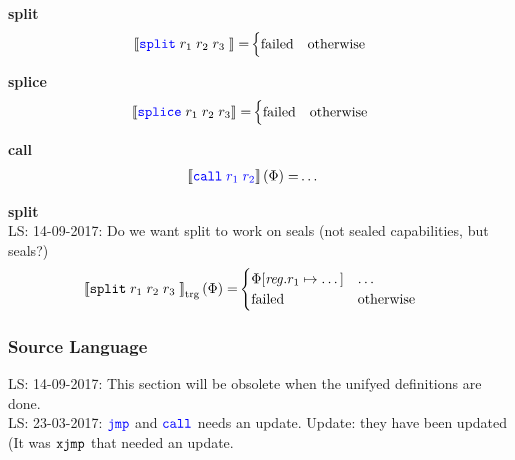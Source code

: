 \documentclass[a4paper]{article}
\newcommand\lau[1]{{\color{purple} \sf \footnotesize {LS: #1}}\\}
\newcommand{\sem}[1]{\left\llbracket #1 \right\rrbracket}
\newcommand{\tsem}[2][\Phi]{\sem{#2}_{\mathrm{trg}}(#1)}
\newcommand{\totherwise}{\text{otherwise }}
\newcommand{\sourcecolor}[1]{\color{blue}}
\newcommand{\src}[1]{{\sourcecolor{} #1}}
\newcommand{\targetcolor}[1]{\color{black}}
\newcommand{\trg}[1]{{\targetcolor{} #1}}
\newcommand{\zinstr}[1]{\texttt{#1}}
\newcommand{\oneinstr}[2]{
  \ifthenelse{\equal{#2}{}}
  {\zinstr{#1}}
  {\zinstr{#1} \; #2}
}
\newcommand{\twoinstr}[3]{
  \ifthenelse{\equal{#2#3}{}}
  {\zinstr{#1}}
  {\zinstr{#1} \; #2 \; #3}
}
\newcommand{\threeinstr}[4]{
  \ifthenelse{\equal{#2#3#4}{}}
  {\zinstr{#1}}
  {\zinstr{#1} \; #2 \; #3 \; #4}
}
\newcommand{\fourinstr}[5]{
  \ifthenelse{\equal{#2#3#4#5}{}}
  {\zinstr{#1}}
  {\zinstr{#1} \; #2 \; #3 \; #4 \; #5}
}
\newcommand{\sjmp}[1]{\oneinstr{\src{jmp}}{#1}}
\newcommand{\scall}[2]{\twoinstr{\src{call}}{#1}{#2}}
\newcommand{\sxjmp}[2]{\twoinstr{\trg{xjmp}}{#1}{#2}}
\newcommand{\ssplice}[3]{\threeinstr{\src{splice}}{#1}{#2}{#3}}
\newcommand{\ssplit}[4]{\fourinstr{\src{split}}{#1}{#2}{#3}{#4}}
\newcommand{\tsplit}[4]{\fourinstr{\trg{split}}{#1}{#2}{#3}{#4}}
\newcommand{\update}[2]{[#1 \mapsto #2]}
\newcommand{\updReg}[2]{\update{\reg.#1}{#2}}
\newcommand{\failed}{\mathrm{failed}}
\newcommand{\var}[1]{\mathit{#1}}
\newcommand{\reg}{\var{reg}}
\begin{document}
\noindent\textbf{split}\\
\begin{align*}
  \sem{\ssplit{r_1}{r_2}{r_3}} = &
                              \begin{cases}
                                \failed & \totherwise
                              \end{cases}
\end{align*}

\noindent\textbf{splice}\\
\begin{align*}
  \sem{\ssplice{r_1}{r_2}{r_3}} = &
                              \begin{cases}
                                \failed & \totherwise
                              \end{cases}
\end{align*}

\noindent\textbf{call}\\
\begin{align*}
  \sem{\scall{\src{r_1}}{\src{r_2}}}(\Phi) = & \dots
\end{align*}


\textbf{split}\\
\lau{14-09-2017: Do we want split to work on seals (not sealed capabilities, but seals?)}
\begin{align*}
  \tsem{\tsplit{r_1}{r_2}{r_3}} = &
                               \begin{cases}
                                 \Phi\updReg{r_1}{\dots} &
                                 \arraycolsep=0pt
                                 \begin{array}[t]{l}
                                   \dots
                                 \end{array}\\
                                 \failed & \totherwise
                               \end{cases}
\end{align*}



\subsubsection{Source Language}
\label{sec:source-language}
\lau{14-09-2017: This section will be obsolete when the unifyed definitions are done.}
\lau{23-03-2017: $\sjmp{}$ and $\scall{}{}$ needs an update. Update: they have been updated (It was $\sxjmp{}{}$ that needed an update.}
\end{document}
